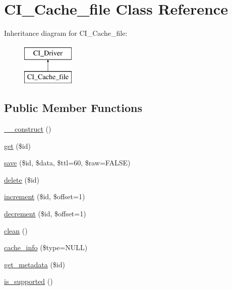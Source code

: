 \hypertarget{class_c_i___cache__file}{}\section{C\+I\+\_\+\+Cache\+\_\+file Class Reference}
\label{class_c_i___cache__file}
Inheritance diagram for C\+I\+\_\+\+Cache\+\_\+file\+:\begin{figure}[H]
\begin{center}
\leavevmode
\includegraphics[height=2.000000cm]{class_c_i___cache__file}
\end{center}
\end{figure}
\subsection*{Public Member Functions}
\begin{DoxyCompactItemize}
\item 
\hyperlink{class_c_i___cache__file_a095c5d389db211932136b53f25f39685}{\+\_\+\+\_\+construct} ()
\item 
\hyperlink{class_c_i___cache__file_a50e3bfb586b2f42932a6a93f3fbb0828}{get} (\$id)
\item 
\hyperlink{class_c_i___cache__file_a472645db04a8ce4b040b789a3062a7d2}{save} (\$id, \$data, \$ttl=60, \$raw=F\+A\+L\+S\+E)
\item 
\hyperlink{class_c_i___cache__file_a2f8258add505482d7f00ea26493a5723}{delete} (\$id)
\item 
\hyperlink{class_c_i___cache__file_a2f07a4e09b57f4460d49852497d1808f}{increment} (\$id, \$offset=1)
\item 
\hyperlink{class_c_i___cache__file_a4eb1c2772c8efc48c411ea060dd040b7}{decrement} (\$id, \$offset=1)
\item 
\hyperlink{class_c_i___cache__file_adb40b812890a8bc058bf6b7a0e1a54d9}{clean} ()
\item 
\hyperlink{class_c_i___cache__file_aa8b9c4d9f0387156736ccd8850f0727e}{cache\+\_\+info} (\$type=N\+U\+L\+L)
\item 
\hyperlink{class_c_i___cache__file_a59635cf18e997c5141bffa05ff7622e0}{get\+\_\+metadata} (\$id)
\item 
\hyperlink{class_c_i___cache__file_a98c68fd153468bc148c4ed8c716859fc}{is\+\_\+supported} ()
\end{DoxyCompactItemize}
